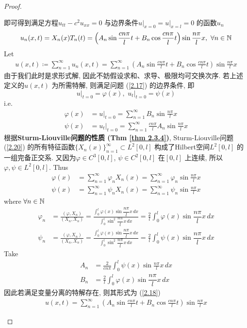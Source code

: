 \begin{thm}
\begin{proof}
\begin{itemize}
\begin{enumerate}
					即可得到满足方程$u_{tt} - c^2 u_{xx} = 0$ 与边界条件$u\Big|_{x = 0} = u \Big|_{x = l} = 0$ 的函数$u_n$
					\[ u_n(x , t) = X_n(x) T_n(t) = \left( A_n \sin \frac{cn\pi}{l} t + B_n \cos \frac{cn\pi}{l} t \right) \sin \frac{n \pi}{l} x , \,\, \forall n \in \mathbb{N} \]
					Let 
					\begin{align*}
						u(x , t) 
						\coloneqq \sum_{n = 1}^{\infty} u_{n}(x , t) 
						= \sum_{n = 1}^{\infty} \left( A_n \sin \frac{cn\pi}{l} t + B_n \cos \frac{cn\pi}{l} t \right) \sin \frac{n \pi}{l} x 
					\end{align*}
					由于我们此时是求形式解, 因此不妨假设求和、求导、极限均可交换次序. 若上述定义的$u(x , t)$ 为所需特解, 则满足问题 (\ref{2.17}) 的边界条件, 即
					\[ u\Big|_{t = 0} = \varphi(x) , \,\, u_t \Big|_{t = 0} = \psi(x) \]
					i.e.
					\begin{align*}
						\varphi(x) &= u\Big|_{t = 0} = \sum_{n = 1}^{\infty} B_n \sin \frac{n\pi}{l} x \\
						\psi(x) &= u_t \Big|_{t = 0} = \sum_{n = 1}^{\infty} \frac{cn\pi}{l} A_n \sin \frac{n\pi}{l} x
					\end{align*}
					根据\textbf{Sturm-Liouville问题的性质 (Thm \ref{thm 2.3.4})}, Sturm-Liouville问题 (\ref{2.20}) 的所有特征函数$\{ X_n(x) \}_{n = 1}^{\infty} \subset L^2[0 , l]$ 构成了Hilbert空间$L^2[0 , l]$ 的一组完备正交系. 又因为$\varphi \in C^3[0 , l]$, $\psi \in C^2[0 , l]$ 在$[0 , l]$ 上连续, 所以$\varphi , \psi \in L^2[0 , l]$. Thus 
					\begin{align*}
						\varphi(x) &= \sum_{n = 1}^{\infty} \varphi_n X_n(x) = \sum_{n = 1}^{\infty} \varphi_n \sin \frac{n\pi}{l} x \\
						\psi(x) &= \sum_{n = 1}^{\infty} \psi_n X_n(x) = \sum_{n = 1}^{\infty} \psi_n \sin \frac{n\pi}{l} x
					\end{align*}
					where $\forall n \in \mathbb{N}$
					\begin{align*}
						\varphi_n &= \frac{(\varphi , X_n)}{(X_n , X_n)} = \frac{\int_{0}^l \varphi(x) \sin \dfrac{n\pi}{l} x \, dx}{\int_{0}^l \sin^2 \dfrac{n\pi}{l} x \, dx} = \frac{2}{l} \int_{0}^l \varphi(x) \sin \dfrac{n\pi}{l} x \, dx \\
						\psi_n &= \frac{(\varphi , X_n)}{(X_n , X_n)} = \frac{\int_{0}^l \varphi(x) \sin \dfrac{n\pi}{l} x \, dx}{\int_{0}^l \sin^2 \dfrac{n\pi}{l} x \, dx} = \frac{2}{l} \int_{0}^l \psi(x) \sin \dfrac{n\pi}{l} x \, dx
					\end{align*}
					Take
					\begin{align*}
						A_n &= \frac{2}{cn\pi} \int_{0}^l \psi(x) \sin \frac{n\pi}{l} x \, dx \\
						B_n &= \frac{2}{l} \int_{0}^l \varphi(x) \sin \dfrac{n\pi}{l} x \, dx
					\end{align*}
					因此若满足变量分离的特解存在, 则其形式为 (\ref{2.18})
					\begin{align*}
						u(x , t) = \sum_{n = 1}^{\infty} \left( A_n \sin \frac{cn\pi}{l} t + B_n \cos \frac{cn\pi}{l} t \right) \sin \frac{n\pi}{l} x
					\end{align*}
					

\end{enumerate}
\end{itemize}
\end{proof}
\end{thm}
